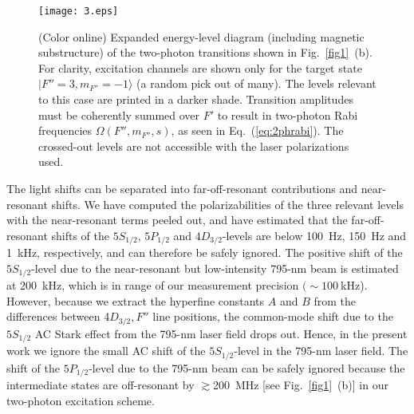 \documentclass[reprint, amsmath,amssymb, aps, pra, longbibliography]{revtex4-1}
\begin{document}
\begin{figure}[htb]
 \centering
  \texttt{[image: 3.eps]}
  \caption{(Color online) Expanded energy-level diagram (including magnetic substructure) of the two-photon transitions shown in Fig.~\ref{fig1}~(b). For clarity, excitation channels are shown only for the target state $|F''=3, m_{F''}=-1 \rangle$ (a random pick out of many). The levels relevant to this case are printed in a darker shade. Transition amplitudes must be coherently summed over $F'$ to result in two-photon Rabi frequencies $\Omega(F'',m_{F''}, s)$, as seen in Eq.~(\ref{eq:2phrabi}).
  The crossed-out levels are not accessible with the laser polarizations used.
  } 
  \label{fig3}
\end{figure}

The light shifts can be separated into far-off-resonant contributions and
near-resonant shifts. We have computed the polarizabilities of the three relevant levels with the near-resonant terms peeled out, and have estimated that the far-off-resonant shifts of the $5S_{1/2}$, $5P_{1/2}$ and $4D_{3/2}$-levels are below 100~Hz, 150~Hz and 1~kHz, respectively, and can therefore be safely ignored. The positive shift of the $5S_{1/2}$-level due to the near-resonant but low-intensity 795-nm beam is estimated at 200~kHz, which is in range of our measurement precision  $(\sim 100~$kHz). 
However, because we extract the hyperfine constants $A$ and $B$ from the differences between 4$D_{3/2}, F''$ line positions, the common-mode shift due to the
$5S_{1/2}$ AC Stark effect from the 795-nm laser field 
drops out. Hence, in the present work we ignore the small AC shift of the $5S_{1/2}$-level in the 795-nm laser field. The shift of the $5P_{1/2}$-level due to the 795-nm beam can be safely ignored because the intermediate states are off-resonant by $\gtrsim$200~MHz [see Fig.~\ref{fig1}~(b)] in our two-photon excitation scheme.
\end{document}
